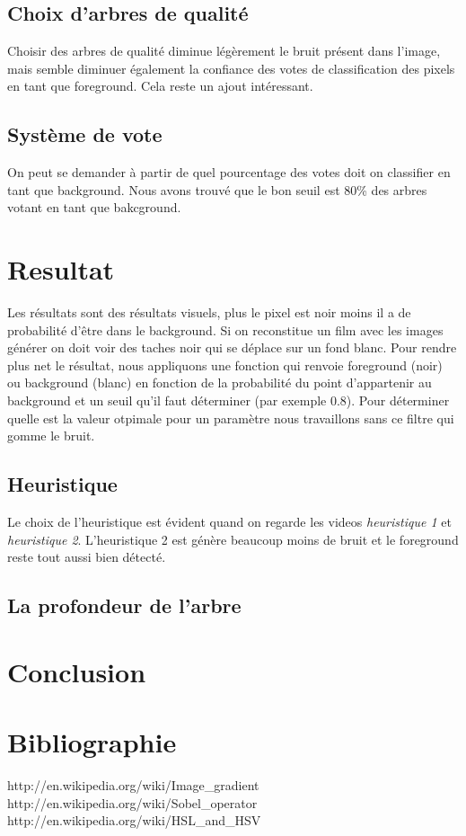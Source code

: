 \documentclass[11pt,a4paper]{report}
\begin{document}
	\subsection{Choix d'arbres de qualité}
	Choisir des arbres de qualité diminue légèrement le bruit présent dans l'image, mais semble diminuer également la confiance des votes
	de classification des pixels en tant que foreground. Cela reste un ajout intéressant. 

	\subsection{Système de vote}
	On peut se demander à partir de quel pourcentage des votes doit on classifier en tant que background. Nous avons trouvé que le bon
	seuil est 80\% des arbres votant en tant que bakcground.

\section{Resultat}
Les résultats sont des résultats visuels, plus le pixel est noir moins il a de probabilité d'être dans le background. Si on reconstitue un film avec les images générer on doit voir des taches noir qui se déplace sur un fond blanc. Pour rendre plus net le résultat, nous appliquons une fonction qui renvoie foreground (noir) ou background (blanc) en fonction de la probabilité du point d'appartenir au background et un seuil qu'il faut déterminer (par exemple 0.8). Pour déterminer quelle est la valeur otpimale pour un paramètre nous travaillons sans ce filtre qui gomme le bruit. 

\subsection{Heuristique}
Le choix de l'heuristique est évident quand on regarde les videos \textit{heuristique 1} et \textit{heuristique 2}. L'heuristique 2 est génère beaucoup moins de bruit et le foreground reste tout aussi bien détecté. 

\subsection{La profondeur de l'arbre}

\section{Conclusion}

	
	
\section{Bibliographie}	
\begin{thebibliography}{2}
    http://en.wikipedia.org/wiki/Image\_gradient
    http://en.wikipedia.org/wiki/Sobel\_operator
    http://en.wikipedia.org/wiki/HSL\_and\_HSV  
\end{thebibliography}
\end{document}
